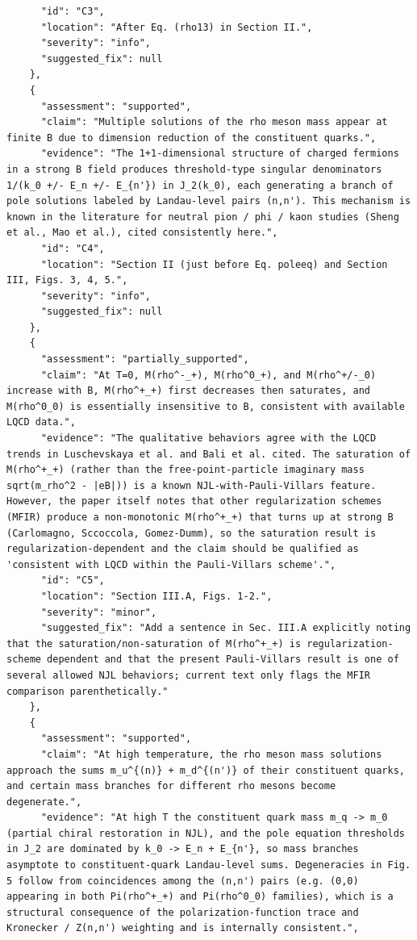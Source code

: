 \documentclass[11pt]{article}
\begin{document}
\begin{verbatim}
      "id": "C3",
      "location": "After Eq. (rho13) in Section II.",
      "severity": "info",
      "suggested_fix": null
    },
    {
      "assessment": "supported",
      "claim": "Multiple solutions of the rho meson mass appear at finite B due to dimension reduction of the constituent quarks.",
      "evidence": "The 1+1-dimensional structure of charged fermions in a strong B field produces threshold-type singular denominators 1/(k_0 +/- E_n +/- E_{n'}) in J_2(k_0), each generating a branch of pole solutions labeled by Landau-level pairs (n,n'). This mechanism is known in the literature for neutral pion / phi / kaon studies (Sheng et al., Mao et al.), cited consistently here.",
      "id": "C4",
      "location": "Section II (just before Eq. poleeq) and Section III, Figs. 3, 4, 5.",
      "severity": "info",
      "suggested_fix": null
    },
    {
      "assessment": "partially_supported",
      "claim": "At T=0, M(rho^-_+), M(rho^0_+), and M(rho^+/-_0) increase with B, M(rho^+_+) first decreases then saturates, and M(rho^0_0) is essentially insensitive to B, consistent with available LQCD data.",
      "evidence": "The qualitative behaviors agree with the LQCD trends in Luschevskaya et al. and Bali et al. cited. The saturation of M(rho^+_+) (rather than the free-point-particle imaginary mass sqrt(m_rho^2 - |eB|)) is a known NJL-with-Pauli-Villars feature. However, the paper itself notes that other regularization schemes (MFIR) produce a non-monotonic M(rho^+_+) that turns up at strong B (Carlomagno, Sccoccola, Gomez-Dumm), so the saturation result is regularization-dependent and the claim should be qualified as 'consistent with LQCD within the Pauli-Villars scheme'.",
      "id": "C5",
      "location": "Section III.A, Figs. 1-2.",
      "severity": "minor",
      "suggested_fix": "Add a sentence in Sec. III.A explicitly noting that the saturation/non-saturation of M(rho^+_+) is regularization-scheme dependent and that the present Pauli-Villars result is one of several allowed NJL behaviors; current text only flags the MFIR comparison parenthetically."
    },
    {
      "assessment": "supported",
      "claim": "At high temperature, the rho meson mass solutions approach the sums m_u^{(n)} + m_d^{(n')} of their constituent quarks, and certain mass branches for different rho mesons become degenerate.",
      "evidence": "At high T the constituent quark mass m_q -> m_0 (partial chiral restoration in NJL), and the pole equation thresholds in J_2 are dominated by k_0 -> E_n + E_{n'}, so mass branches asymptote to constituent-quark Landau-level sums. Degeneracies in Fig. 5 follow from coincidences among the (n,n') pairs (e.g. (0,0) appearing in both Pi(rho^+_+) and Pi(rho^0_0) families), which is a structural consequence of the polarization-function trace and Kronecker / Z(n,n') weighting and is internally consistent.",

\end{verbatim}
\end{document}
